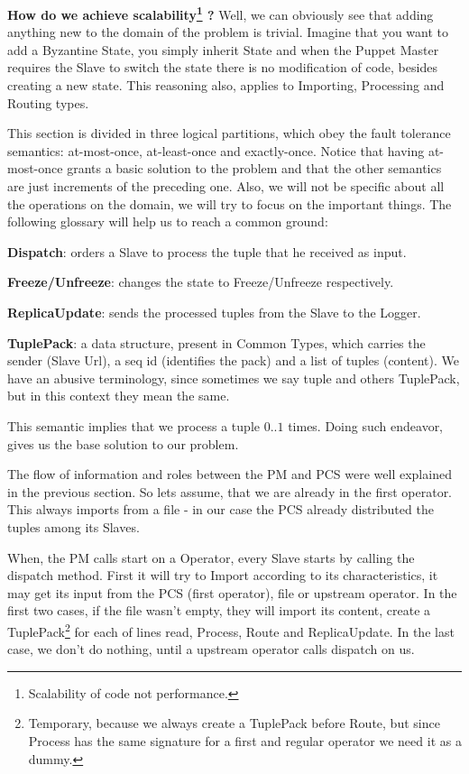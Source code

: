 \documentclass[times, 10pt,twocolumn]{article}
\begin{document}
\textbf{How do we achieve scalability\footnote{%
		Scalability of code not performance.
	} 
	?} Well, we can obviously see that adding anything new to the domain of the problem is trivial. Imagine that you want to add a Byzantine State, you simply inherit State and when the Puppet Master requires the Slave to switch the state there is no modification of code, besides creating a new state. This reasoning also, applies to Importing, Processing and Routing types.



This section is divided in three logical partitions, which obey the fault tolerance semantics: at-most-once, at-least-once and exactly-once. Notice that having at-most-once grants a basic solution to the problem and that the other semantics are just increments of the preceding one. Also, we will not be specific about all the operations on the domain, we will try to focus on the important things. The following glossary will help us to reach a common ground:

\textbf{Dispatch}: orders a Slave to process the tuple that he received as input.

\textbf{Freeze/Unfreeze}: changes the state to Freeze/Unfreeze respectively.

\textbf{ReplicaUpdate}: sends the processed tuples from the Slave to the Logger.

\textbf{TuplePack}: a data structure, present in Common Types, which carries the sender (Slave Url), a seq id (identifies the pack) and a list of tuples (content). We have an abusive terminology, since sometimes we say tuple and others TuplePack, but in this context they mean the same.


This semantic implies that we process a tuple $0..1$ times. Doing such endeavor, gives us the base solution to our problem.

The flow of information and roles between the PM and PCS were well explained in the previous section. So lets assume, that we are already in the first operator. This always imports from a file - in our case the PCS already distributed the tuples among its Slaves. 

When, the PM calls start on a Operator, every Slave starts by calling the dispatch method. First it will try to Import according to its characteristics, it may get its input from the PCS (first operator), file or upstream operator. In the first two cases, if the file wasn't empty, they will import its content, create a TuplePack\footnote
{%
	Temporary, because we always create a TuplePack before Route, but since Process has the same signature for a first and regular operator we need it as a dummy.
} 
for each of lines read, Process, Route and ReplicaUpdate. In the last case, we don't do nothing, until a upstream operator calls dispatch on us.
\end{document}
